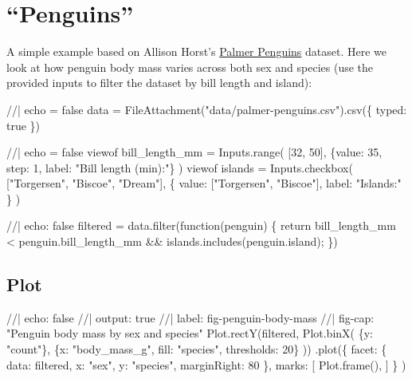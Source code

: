 \documentclass[
  a4paper,
]{scrbook}
\newenvironment{Shaded}{}{}
\newcommand{\NormalTok}[1]{\textcolor[rgb]{0.14,0.16,0.18}{#1}}
\begin{document}
\hypertarget{penguins}{%
\chapter{``Penguins''}\label{penguins}}

A simple example based on Allison Horst's
\href{https://allisonhorst.github.io/palmerpenguins/}{Palmer Penguins}
dataset. Here we look at how penguin body mass varies across both sex
and species (use the provided inputs to filter the dataset by bill
length and island):

\begin{Shaded}
\begin{Highlighting}[numbers=left,,]
\NormalTok{//| echo = false}
\NormalTok{data = FileAttachment("data/palmer{-}penguins.csv").csv(\{ typed: true \})}
\end{Highlighting}
\end{Shaded}

\begin{Shaded}
\begin{Highlighting}[numbers=left,,]
\NormalTok{//| echo = false}
\NormalTok{viewof bill\_length\_mm = Inputs.range(}
\NormalTok{  [32, 50], }
\NormalTok{  \{value: 35, step: 1, label: "Bill length (min):"\}}
\NormalTok{)}
\NormalTok{viewof islands = Inputs.checkbox(}
\NormalTok{  ["Torgersen", "Biscoe", "Dream"], }
\NormalTok{  \{ value: ["Torgersen", "Biscoe"], }
\NormalTok{    label: "Islands:"}
\NormalTok{  \}}
\NormalTok{)}
\end{Highlighting}
\end{Shaded}

\begin{Shaded}
\begin{Highlighting}[numbers=left,,]
\NormalTok{//| echo: false}
\NormalTok{filtered = data.filter(function(penguin) \{}
\NormalTok{  return bill\_length\_mm \textless{} penguin.bill\_length\_mm \&\&}
\NormalTok{         islands.includes(penguin.island);}
\NormalTok{\})}
\end{Highlighting}
\end{Shaded}

\hypertarget{plot}{%
\section{Plot}\label{plot}}

\begin{Shaded}
\begin{Highlighting}[numbers=left,,]
\NormalTok{//| echo: false}
\NormalTok{//| output: true}
\NormalTok{//| label: fig{-}penguin{-}body{-}mass}
\NormalTok{//| fig{-}cap: "Penguin body mass by sex and species"}
\NormalTok{Plot.rectY(filtered, }
\NormalTok{  Plot.binX(}
\NormalTok{    \{y: "count"\}, }
\NormalTok{    \{x: "body\_mass\_g", fill: "species", thresholds: 20\}}
\NormalTok{  ))}
\NormalTok{  .plot(\{}
\NormalTok{    facet: \{}
\NormalTok{      data: filtered,}
\NormalTok{      x: "sex",}
\NormalTok{      y: "species",}
\NormalTok{      marginRight: 80}
\NormalTok{    \},}
\NormalTok{    marks: [}
\NormalTok{      Plot.frame(),}
\NormalTok{    ]}
\NormalTok{  \}}
\NormalTok{)}
\end{Highlighting}
\end{Shaded}
\end{document}
